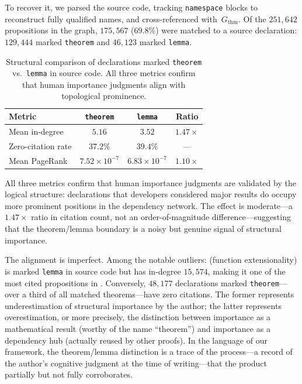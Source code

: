 To recover it, we parsed the  source code, tracking \texttt{namespace} blocks to reconstruct fully qualified names, and cross-referenced with~$G_{\mathrm{thm}}$. Of the $251{,}642$ propositions in the graph, $175{,}567$ ($69.8\%$) were matched to a source declaration: $129{,}444$ marked \texttt{theorem} and $46{,}123$ marked \texttt{lemma}.

\begin{table}[ht]
\centering
\begin{tabular}{lccc}
\toprule
Metric & \texttt{theorem} & \texttt{lemma} & Ratio \\
\midrule
Mean in-degree        & $5.16$ & $3.52$ & $1.47\times$ \\
Zero-citation rate    & $37.2\%$ & $39.4\%$ & --- \\
Mean PageRank         & $7.52 \times 10^{-7}$ & $6.83 \times 10^{-7}$ & $1.10\times$ \\
\bottomrule
\end{tabular}
\caption{Structural comparison of declarations marked \texttt{theorem} vs.\ \texttt{lemma} in source code. All three metrics confirm that human importance judgments align with topological prominence.}
\label{tab:thm-vs-lemma}
\end{table}

All three metrics confirm that human importance judgments are validated by the logical structure: declarations that developers considered major results do occupy more prominent positions in the dependency network. The effect is moderate---a $1.47\times$ ratio in citation count, not an order-of-magnitude difference---suggesting that the theorem/lemma boundary is a noisy but genuine signal of structural importance.

\begin{remark}
\label{rem:misjudged}
The alignment is imperfect. Among the notable outliers:  (function extensionality) is marked \texttt{lemma} in source code but has in-degree $15{,}574$, making it one of the most cited propositions in . Conversely, $48{,}177$ declarations marked \texttt{theorem}---over a third of all matched theorems---have zero citations. The former represents underestimation of structural importance by the author; the latter represents overestimation, or more precisely, the distinction between importance as a mathematical result (worthy of the name ``theorem'') and importance as a dependency hub (actually reused by other proofs). In the language of our framework, the theorem/lemma distinction is a trace of the process---a record of the author's cognitive judgment at the time of writing---that the product partially but not fully corroborates.
\end{remark}


